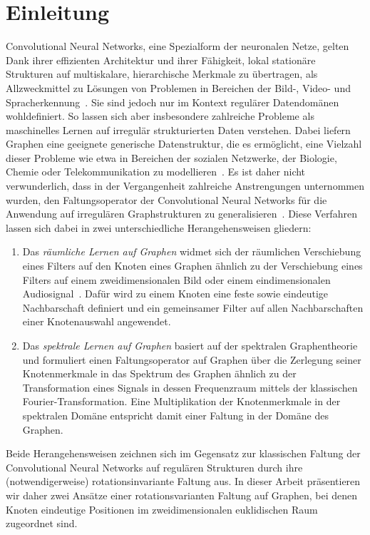 \chapter{Einleitung}
\label{einleitung}

Convolutional Neural Networks, eine Spezialform der neuronalen Netze, gelten Dank ihrer effizienten Architektur und ihrer Fähigkeit, lokal stationäre Strukturen auf multiskalare, hierarchische Merkmale zu übertragen, als Allzweckmittel zu Lösungen von Problemen in Bereichen der Bild-, Video- und Spracherkennung~\cite{Defferrard}.
Sie sind jedoch nur im Kontext regulärer Datendomänen wohldefiniert.
So lassen sich aber insbesondere zahlreiche Probleme als maschinelles Lernen auf irregulär strukturierten Daten verstehen.
Dabei liefern Graphen eine geeignete generische Datenstruktur, die es ermöglicht, eine Vielzahl dieser Probleme wie etwa in Bereichen der sozialen Netzwerke, der Biologie, Chemie oder Telekommunikation zu modellieren~\cite{Shuman}.
Es ist daher nicht verwunderlich, dass in der Vergangenheit zahlreiche Anstrengungen unternommen wurden, den Faltungsoperator der Convolutional Neural Networks für die Anwendung auf irregulären Graphstrukturen zu generalisieren~\cite{patchy, Defferrard, gcn}.
Diese Verfahren lassen sich dabei in zwei unterschiedliche Herangehensweisen gliedern:
\begin{enumerate}
  \item Das \emph{räumliche Lernen auf Graphen} widmet sich der räumlichen Verschiebung eines Filters auf den Knoten eines Graphen ähnlich zu der Verschiebung eines Filters auf einem zweidimensionalen Bild oder einem eindimensionalen Audiosignal~\cite{patchy}.
  Dafür wird zu einem Knoten eine feste sowie eindeutige Nachbarschaft definiert und ein gemeinsamer Filter auf allen Nachbarschaften einer Knotenauswahl angewendet.
  \item Das \emph{spektrale Lernen auf Graphen} basiert auf der spektralen Graphentheorie und formuliert einen Faltungsoperator auf Graphen über die Zerlegung seiner Knotenmerkmale in das Spektrum des Graphen ähnlich zu der Transformation eines Signals in dessen Frequenzraum mittels der klassischen Fourier-Transformation.
  Eine Multiplikation der Knotenmerkmale in der spektralen Domäne entspricht damit einer Faltung in der Domäne des Graphen.
\end{enumerate}
Beide Herangehensweisen zeichnen sich im Gegensatz zur klassischen Faltung der Convolutional Neural Networks auf regulären Strukturen durch ihre (notwendigerweise) rotationsinvariante Faltung aus.
In dieser Arbeit präsentieren wir daher zwei Ansätze \bzgl{} einer rotationsvarianten Faltung auf Graphen, bei denen Knoten eindeutige Positionen im zweidimensionalen euklidischen Raum zugeordnet sind.



